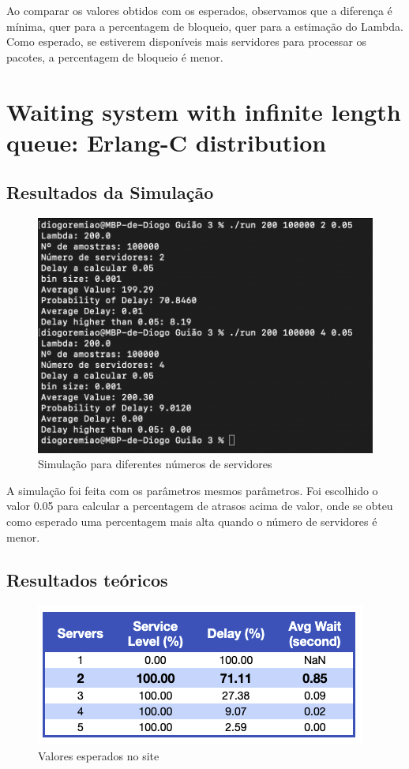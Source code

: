 Ao comparar os valores obtidos com os esperados, observamos que a diferença é mínima, quer para a percentagem de bloqueio, quer para a estimação do Lambda.
Como esperado, se estiverem disponíveis mais servidores para processar os pacotes, a percentagem de bloqueio é menor.

\section*{Waiting system with infinite length queue: Erlang-C distribution} \label{ex_2}

\subsection*{Resultados da Simulação}

\begin{figure}[H]
    \centering
    \includegraphics[width=.5\linewidth]{figs/image_3.png}
    \caption{Simulação para diferentes números de servidores}
    \label{fig:3}
\end{figure}

A simulação foi feita com os parâmetros mesmos parâmetros.
Foi escolhido o valor 0.05 para calcular a percentagem de atrasos acima de valor, onde se obteu como esperado uma percentagem mais alta quando o número de servidores é menor.

\subsection*{Resultados teóricos}

\begin{figure}[H]
    \centering
    \includegraphics[width=.5\linewidth]{figs/image_4.png}
    \caption{Valores esperados no site}
    \label{fig:4}
\end{figure}

